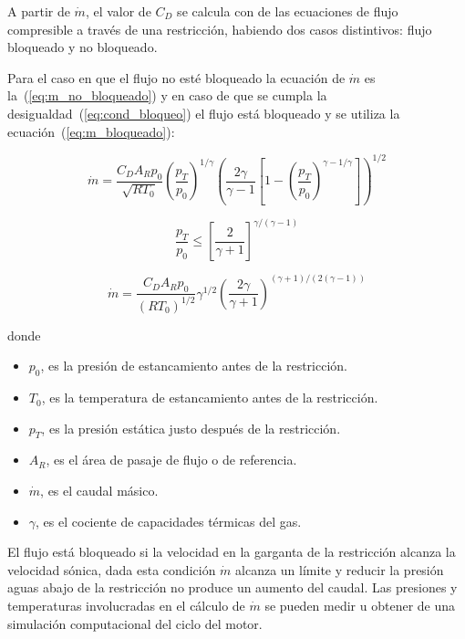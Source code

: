 A partir de $\dot{m}$, el valor de $C_{D}$  se calcula con de las ecuaciones de
flujo compresible a través de una restricción, habiendo dos casos distintivos:
flujo bloqueado y no bloqueado.

Para el caso en que el flujo no esté bloqueado la ecuación de $\dot{m}$ es
la~(\ref{eq:m_no_bloqueado}) y en caso de que se cumpla la
desigualdad~(\ref{eq:cond_bloqueo}) el flujo está bloqueado y se utiliza la
ecuación~(\ref{eq:m_bloqueado}):
%

\begin{equation}\label{eq:m_no_bloqueado}
  \dot{m} = \frac{C_D A_R p_0}{\sqrt{R T_0}} {\left(\frac{p_T}{p_0} \right)}^{1/\gamma} {\left( \frac{2\gamma}{\gamma-1} \left[1- {(\frac{p_T}{p_0})}^{{\gamma-1}/\gamma} \right] \right)}^{1/2}
\end{equation}

\begin{equation}\label{eq:cond_bloqueo}
  \frac{p_T}{p_0} \le {[\frac{2}{\gamma+1}]}^{\gamma/(\gamma - 1)}
\end{equation}

\begin{equation}\label{eq:m_bloqueado}
  \dot{m}=  \frac {C_D A_R p_0} {{(R T_0)}^{1/2}} \gamma^{1/2} {\left( \frac{2\gamma}{\gamma+1} \right)}^{(\gamma+1)/(2(\gamma-1))}
\end{equation}

donde
\begin{itemize}
    \item $p_0$, es la presión de estancamiento antes de la restricción.
    \item $T_0$, es la temperatura de estancamiento antes de la restricción.
    \item $p_T$, es la presión estática justo después de la restricción.
    \item $A_R$, es el área de pasaje de flujo o de referencia.
    \item $\dot{m}$, es el caudal másico.
  \item $\gamma$, es el cociente de capacidades térmicas del gas.
\end{itemize}


El flujo está bloqueado si la velocidad en la garganta de la restricción alcanza
la velocidad sónica, dada esta condición $\dot{m}$ alcanza un límite y reducir
la presión aguas abajo de la restricción no produce un aumento del caudal.
%
%
Las presiones y temperaturas involucradas en el cálculo de $\dot{m}$ se pueden
medir u obtener de una simulación computacional del ciclo del motor.
%

